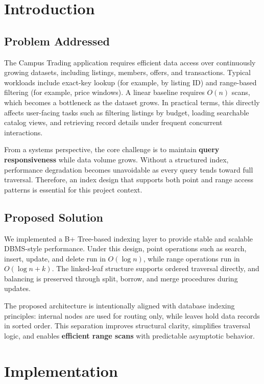 \documentclass[12pt, a4paper]{article}
\begin{document}
\tableofcontents
\newpage

\section{Introduction}
\subsection{Problem Addressed}
The Campus Trading application requires efficient data access over continuously growing datasets, including listings, members, offers, and transactions. Typical workloads include exact-key lookup (for example, by listing ID) and range-based filtering (for example, price windows). A linear baseline requires \(O(n)\) scans, which becomes a bottleneck as the dataset grows. In practical terms, this directly affects user-facing tasks such as filtering listings by budget, loading searchable catalog views, and retrieving record details under frequent concurrent interactions.

From a systems perspective, the core challenge is to maintain \textbf{query responsiveness} while data volume grows. Without a structured index, performance degradation becomes unavoidable as every query tends toward full traversal. Therefore, an index design that supports both point and range access patterns is essential for this project context.

\subsection{Proposed Solution}
We implemented a B+ Tree-based indexing layer to provide stable and scalable DBMS-style performance. Under this design, point operations such as search, insert, update, and delete run in \(O(\log n)\), while range operations run in \(O(\log n + k)\). The linked-leaf structure supports ordered traversal directly, and balancing is preserved through split, borrow, and merge procedures during updates.

The proposed architecture is intentionally aligned with database indexing principles: internal nodes are used for routing only, while leaves hold data records in sorted order. This separation improves structural clarity, simplifies traversal logic, and enables \textbf{efficient range scans} with predictable asymptotic behavior.

\section{Implementation}
\end{document}
